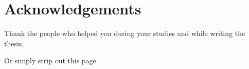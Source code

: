 \chapter*{Acknowledgements}

Thank the people who helped you during your studies and while writing
the thesis.

Or simply strip out this page.
